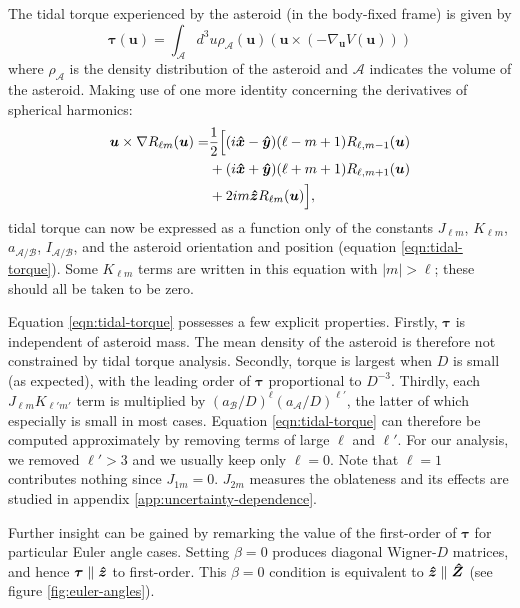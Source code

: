 The tidal torque experienced by the asteroid (in the body-fixed frame) is given by
\begin{equation}
  \bm{\tau}(\bm u) = \int_\mathcal{A} d^3 u \rho_\mathcal{A}(\bm u) (\bm u \times (-\nabla_{\bm u} V(\bm u)))
\end{equation}
where $\rho_\mathcal{A}$ is the density distribution of the asteroid and $\mathcal{A}$ indicates the volume of the asteroid. Making use of one more identity concerning the derivatives of spherical harmonics:
\begin{equation}
  \begin{split}
  \bm u \times \nabla R_{\ell m}(\bm u)=&\frac{1}{2}\Big[(i\bm{\hat{x}} - \bm{\hat{y}})(\ell-m+1)R_{\ell,m-1}(\bm u)\\
  &+(i\bm{\hat{x}}+\bm{\hat{y}})(\ell+m+1)R_{\ell,m+1}(\bm u)\\
  & +2im\bm{\hat{z}} R_{\ell m}(\bm u)\Big],
  \end{split}
\end{equation}
tidal torque can now be expressed as a function only of the constants $J_{\ell m}$, $K_{\ell m}$, $a_\mathcal{A/B}$, $I_\mathcal{A/B}$, and the asteroid orientation and position (equation \ref{eqn:tidal-torque}). Some $K_{\ell m}$ terms are written in this equation with $|m|>\ell$; these should all be taken to be zero.

Equation \ref{eqn:tidal-torque} possesses a few explicit properties. Firstly, $\bm \tau$ is independent of asteroid mass. The mean density of the asteroid is therefore not constrained by tidal torque analysis. Secondly, torque is largest when $D$ is small (as expected), with the leading order of $\bm \tau$ proportional to $D^{-3}$. Thirdly, each $J_{\ell m}K_{\ell' m'}$ term is multiplied by $(a_\mathcal{B}/D)^\ell (a_\mathcal{A}/D)^{\ell'}$, the latter of which especially is small in most cases. Equation \ref{eqn:tidal-torque} can therefore be computed approximately by removing terms of large $\ell$ and $\ell'$. For our analysis, we removed $\ell' > 3$ and we usually keep only $\ell=0$. Note that $\ell=1$ contributes nothing since $J_{1m}=0$. $J_{2m}$ measures the oblateness and its effects are studied in appendix \ref{app:uncertainty-dependence}.

Further insight can be gained by remarking the value of the first-order of $\bm \tau$ for particular Euler angle cases. Setting $\beta = 0$ produces diagonal Wigner-$D$ matrices, and hence $\bm \tau \parallel \bm{\hat{z}}$ to first-order. This $\beta=0$ condition is equivalent to $\bm{\hat{z}} \parallel \bm{\hat{Z}}$ (see figure \ref{fig:euler-angles}).

